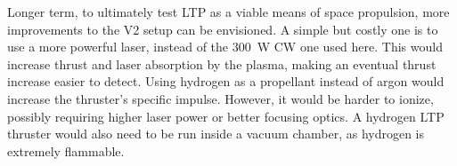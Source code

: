 Longer term, to ultimately test LTP as a viable means of space propulsion, more improvements to the V2 setup can be envisioned. A simple but costly one is to use a more powerful laser, instead of the \qty{300}{W} CW one used here. This would increase thrust and laser absorption by the plasma, making an eventual thrust increase easier to detect. Using hydrogen as a propellant instead of argon would increase the thruster's specific impulse. However, it would be harder to ionize, possibly requiring higher laser power or better focusing optics. A hydrogen LTP thruster would also need to be run inside a vacuum chamber, as hydrogen is extremely flammable.




    